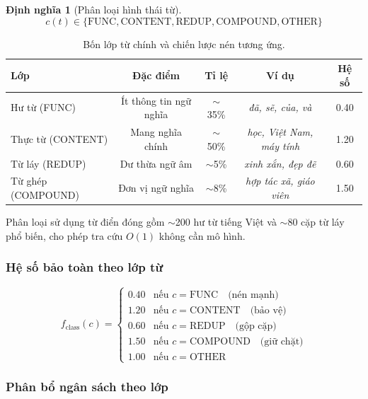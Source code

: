 \documentclass[12pt,a4paper]{article}
\newtheorem{definition}{Định nghĩa}[section]
\newcommand{\viet}[1]{\textit{#1}}           %
\begin{document}
\begin{definition}[Phân loại hình thái từ]
$$c(t) \in \{\text{FUNC}, \text{CONTENT}, \text{REDUP}, \text{COMPOUND}, \text{OTHER}\}$$
\end{definition}

\begin{table}[H]
\centering
\caption{Bốn lớp từ chính và chiến lược nén tương ứng.}
\label{tab:word_classes}
\begin{tabular}{lcccc}
\toprule
\textbf{Lớp} & \textbf{Đặc điểm} & \textbf{Tỉ lệ} & \textbf{Ví dụ} & \textbf{Hệ số} \\
\midrule
Hư từ (FUNC) & Ít thông tin ngữ nghĩa & $\sim$35\% & \viet{đã, sẽ, của, và} & 0.40 \\
Thực từ (CONTENT) & Mang nghĩa chính & $\sim$50\% & \viet{học, Việt Nam, máy tính} & 1.20 \\
Từ láy (REDUP) & Dư thừa ngữ âm & $\sim$5\% & \viet{xinh xắn, đẹp đẽ} & 0.60 \\
Từ ghép (COMPOUND) & Đơn vị ngữ nghĩa & $\sim$8\% & \viet{hợp tác xã, giáo viên} & 1.50 \\
\bottomrule
\end{tabular}
\end{table}

Phân loại sử dụng từ điển đóng gồm $\sim$200 hư từ tiếng Việt và $\sim$80 cặp từ láy phổ biến, cho phép tra cứu $O(1)$ không cần mô hình.

\subsubsection{Hệ số bảo toàn theo lớp từ}

\begin{equation}\label{eq:class_mult}
    f_{\text{class}}(c) = \begin{cases}
        0.40 & \text{nếu } c = \text{FUNC} \quad \text{(nén mạnh)} \\
        1.20 & \text{nếu } c = \text{CONTENT} \quad \text{(bảo vệ)} \\
        0.60 & \text{nếu } c = \text{REDUP} \quad \text{(gộp cặp)} \\
        1.50 & \text{nếu } c = \text{COMPOUND} \quad \text{(giữ chặt)} \\
        1.00 & \text{nếu } c = \text{OTHER}
    \end{cases}
\end{equation}

\subsubsection{Phân bổ ngân sách theo lớp}
\end{document}
